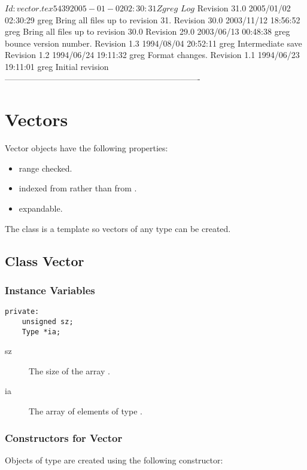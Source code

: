 \C 
\C $Id: vector.tex 5439 2005-01-02 02:30:31Z greg $
\C 
\C $Log$
\C Revision 31.0  2005/01/02 02:30:29  greg
\C Bring all files up to revision 31.
\C
\C Revision 30.0  2003/11/12 18:56:52  greg
\C Bring all files up to revision 30.0
\C
\C Revision 29.0  2003/06/13 00:48:38  greg
\C bounce version number.
\C
\C Revision 1.3  1994/08/04 20:52:11  greg
\C Intermediate save
\C
\C Revision 1.2  1994/06/24  19:11:32  greg
\C Format changes.
\C
\C Revision 1.1  1994/06/23  19:11:01  greg
\C Initial revision
\C
\C ----------------------------------------------------------------------
\section{Vectors}
\label{sec:vector}

Vector objects have the following properties:\begin{itemize}
\item range checked.
\item indexed from  rather than from . 
\item expandable.
\end{itemize}
The  class is a template so
vectors of any type can be created.  

\subsection{Class Vector}

\subsubsection{Instance Variables}

\begin{verbatim}
private:
    unsigned sz;
    Type *ia;
\end{verbatim}

\begin{description}
\item[sz] \texonly{---} The size of the array .
\item[ia] \texonly{---} The array of elements of type .
\end{description}
\subsubsection{Constructors for Vector}
\label{sec:vector-constructors}

Objects of type  are created using the following
constructor:

